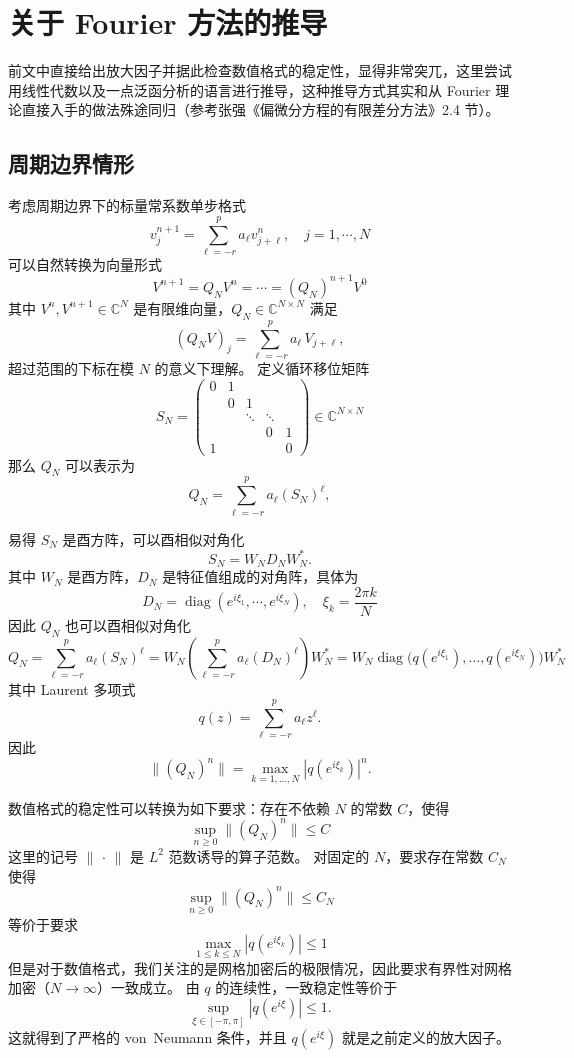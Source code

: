 \chapter{关于 Fourier 方法的推导}

前文中直接给出放大因子并据此检查数值格式的稳定性，显得非常突兀，这里尝试用线性代数以及一点泛函分析的语言进行推导，这种推导方式其实和从 Fourier 理论直接入手的做法殊途同归（参考张强《偏微分方程的有限差分方法》2.4 节）。

\section{周期边界情形}

考虑周期边界下的标量常系数单步格式
\[
    v_j^{n+1} = \sum_{\ell=-r}^{p} a_\ell v_{j+\ell}^n, \quad j=1,\cdots,N
\]
可以自然转换为向量形式
\[
    V^{n+1} = Q_N V^n = \cdots = (Q_N)^{n+1} V^0
\]
其中 $V^{n},V^{n+1} \in \mathbb{C}^N$ 是有限维向量，$Q_N \in \mathbb{C}^{N\times N}$ 满足
\[
    (Q_N V)_j = \sum_{\ell=-r}^{p} a_\ell\, V_{j+\ell},
\]
超过范围的下标在模 $N$ 的意义下理解。
定义循环移位矩阵
\[
    S_N =
    \begin{pmatrix}
        0 & 1 &        &        &   \\
          & 0 & 1      &        &   \\
          &   & \ddots & \ddots &   \\
          &   &        & 0      & 1 \\
        1 &   &        &        & 0
    \end{pmatrix} \in \mathbb{C}^{N\times N}
\]
那么 $Q_N$ 可以表示为
\[
    Q_N = \sum_{\ell=-r}^{p} a_\ell (S_N)^\ell,
\]

易得 $S_N$ 是酉方阵，可以酉相似对角化
\[
    S_N = W_N D_N W_N^*.
\]
其中 $W_N$ 是酉方阵，$D_N$ 是特征值组成的对角阵，具体为
\[
    D_N = \operatorname{diag}(e^{i\xi_1},\cdots,e^{i\xi_N}), \quad \xi_k=\frac{2\pi k}{N}
\]
因此 $Q_N$ 也可以酉相似对角化
\[
    Q_N = \sum_{\ell=-r}^{p} a_\ell (S_N)^\ell
    = W_N \left(\sum_{\ell=-r}^{p} a_\ell (D_N)^\ell\right) W_N^*
    = W_N \operatorname{diag}\bigl(q(e^{i\xi_1}),\dots,q(e^{i\xi_N})\bigr) W_N^*
\]
其中 Laurent 多项式
\[
    q(z) = \sum_{\ell=-r}^{p} a_\ell z^\ell.
\]
因此
\[
    \|(Q_N)^n\| = \max_{k=1,\dots,N} |q(e^{i\xi_k})|^n .
\]

数值格式的稳定性可以转换为如下要求：存在不依赖 $N$ 的常数 $C$，使得
\[
    \sup_{n\ge 0} \|(Q_N)^n\| \le C
\]
这里的记号 $\|\,\cdot\,\|$ 是 $L^2$ 范数诱导的算子范数。
对固定的 $N$，要求存在常数 $C_N$ 使得
\[
    \sup_{n\ge 0} \|(Q_N)^n\| \le C_N
\]
等价于要求
\[
    \max_{1\le k \le N} |q(e^{i\xi_k})| \le 1
\]
但是对于数值格式，我们关注的是网格加密后的极限情况，因此要求有界性对网格加密（$N\to\infty$）一致成立。
由 $q$ 的连续性，一致稳定性等价于
\[
    \sup_{\xi\in[-\pi,\pi]} |q(e^{i\xi})| \le 1.
\]
这就得到了严格的 von~Neumann 条件，并且 $q(e^{i\xi})$ 就是之前定义的放大因子。

